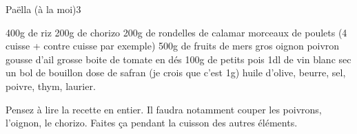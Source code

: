 \begin{recette}{Paëlla (à la moi)}{3}{}{}
\begin{ingredients}
\ingredient 400g de riz
\ingredient 200g de chorizo
\ingredient 200g de rondelles de calamar
 morceaux de poulets (4 cuisse + contre cuisse par exemple)
\ingredient 500g de fruits de mers
 gros oignon
 poivron
 gousse d'ail
 grosse boite de tomate en dés
\ingredient 100g de petits pois
\ingredient 1dl de vin blanc sec
\ingredient un bol de bouillon
 dose de safran (je crois que c'est 1g)
\ingredient huile d'olive, beurre, sel, poivre, thym, laurier.
\end{ingredients}

\begin{preparation*}
Pensez à lire la recette en entier. Il faudra notamment couper les poivrons, l'oignon, le chorizo. Faites ça pendant la cuisson des autres éléments.


\end{preparation*}
\end{recette}
